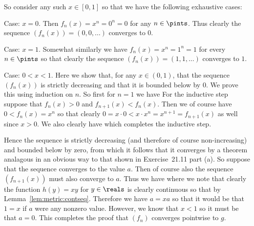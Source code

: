 {{    So consider any such $x \in [0,1]$ so that we have the following exhaustive cases:

    Case: $x = 0$.
    Then $f_n(x) = x^n = 0^n = 0$ for any $n \in \pints$.
    Thus clearly the sequence $(f_n(x)) = (0,0,\ldots)$ converges to $0$.

    Case: $x = 1$.
    Somewhat similarly we have $f_n(x) = x^n = 1^n = 1$ for every $n \in \pints$ so that clearly the sequence $(f_n(x)) = (1,1,\ldots)$ converges to $1$.

    Case: $0 < x < 1$.
    Here we show that, for any $x \in (0,1)$, that the sequence $(f_n(x))$ is strictly decreasing and that it is bounded below by $0$.
    We prove this using induction on $n$.
    So first for $n = 1$ we have
    For the inductive step suppose that $f_n(x) > 0$ and $f_{n+1}(x) < f_n(x)$.
    Then we of course have $0 < f_n(x) = x^n$ so that clearly $0 = x \cdot 0 < x \cdot x^n = x^{n+1} = f_{n+1}(x)$ as well since $x > 0$.
    We also clearly have
    which completes the inductive step.
    
    Hence the sequence is strictly decreasing (and therefore of course non-increasing) and bounded below by zero, from which it follows that it converges by a theorem analagous in an obvious way to that shown in Exercise~21.11 part (a).
    So suppose that the sequence converges to the value $a$.
    Then of course also the sequence $(f_{n+1}(x))$ must also converge to $a$.
    Thus we have
    where we note that clearly the function $h(y) = xy$ for $y \in \reals$ is clearly continuous so that
    by Lemma~\ref{lem:metric:contseq}.
    Therefore we have $a = xa$ so that it would be that $1 = x$ if $a$ were any nonzero value.
    However, we know that $x < 1$ so it must be that $a = 0$.
    This completes the proof that $(f_n)$ converges pointwise to $g$.

}}
